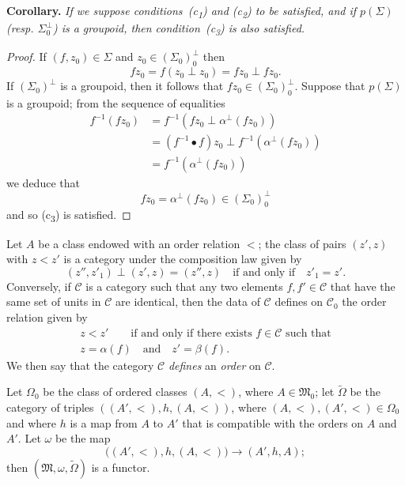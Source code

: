 \documentclass[a4paper,oneside,nobib,nofonts,notitlepage,notoc,nols,fleqn,justified]{tufte-book}
\newenvironment{itenv}[1]
  {\phantomsection\par\medskip\noindent\textbf{#1.}\itshape}
  {\par\medskip}
\newcommand{\oldpage}[1]{{\reversemarginpar\marginnote{\raggedleft\footnotesize\textit{p.~#1}}}}
\newcommand{\CC}{\mathcal{C}}
\newcommand{\MM}{\mathfrak{M}}
\begin{document}
\begin{itenv}{Corollary}
  If we suppose conditions~(c\textsubscript{1}) and (c\textsubscript{2}) to be satisfied, and if $p(\Sigma)$ (resp. $\Sigma_0^\perp$) is a groupoid, then condition~(c\textsubscript{3}) is also satisfied.
\end{itenv}

\begin{proof}
  If $(f,z_0)\in\Sigma$ and $z_0\in(\Sigma_0)_0^\perp$ then
  \[
    fz_0
    = f(z_0\perp z_0)
    =fz_0\perp fz_0.
  \]
  If $(\Sigma_0)^\perp$ is a groupoid, then it follows that $fz_0\in(\Sigma_0)_0^\perp$.
  Suppose that $p(\Sigma)$ is a groupoid;
  from the sequence of equalities
  \[
    \begin{aligned}
      f^{-1}(fz_0)
      &= f^{-1}(fz_0\perp\alpha^\perp(fz_0))
    \\&= (f^{-1}\bullet f)z_0\perp f^{-1}(\alpha^\perp(fz_0))
    \\&= f^{-1}(\alpha^\perp(fz_0))
    \end{aligned}
  \]
  we deduce that
  \[
    fz_0
    = \alpha^\perp(fz_0)
    \in(\Sigma_0)_0^\perp
  \]
  and so (c\textsubscript{3}) is satisfied.
\end{proof}

Let $A$ be a class endowed with an order relation $<$;
the class of pairs $(z',z)$ with $z<z'$ is a category under the composition law given by
\[
  (z'',z'_1)\perp(z',z)
  =(z'',z)
  \quad\text{if and only if}\quad
  z'_1=z'.
\]
\oldpage{356}
Conversely, if $\CC$ is a category such that any two elements $f,f'\in\CC$ that have the same set of units in $\CC$ are identical, then the data of $\CC$ defines on $\CC_0$ the order relation given by
\[
  \begin{gathered}
    z<z'
    \qquad\text{if and only if there exists $f\in\CC$ such that}
  \\z=\alpha(f)
    \quad\text{and}\quad
    z'=\beta(f).
  \end{gathered}
\]
We then say that the category $\CC$ \emph{defines} an \emph{order} on $\CC$.

Let $\Omega_0$ be the class of ordered classes $(A,<)$, where $A\in\MM_0$;
let $\widetilde{\Omega}$ be the category of triples $((A',<),h,(A,<))$, where $(A,<),(A',<)\in\Omega_0$ and where $h$ is a map from $A$ to $A'$ that is compatible with the orders on $A$ and $A'$.
Let $\omega$ be the map
\[
  \big((A',<),h,(A,<)\big)
  \longrightarrow (A',h,A);
\]
then $(\MM,\omega,\widetilde{\Omega})$ is a functor.
\end{document}
